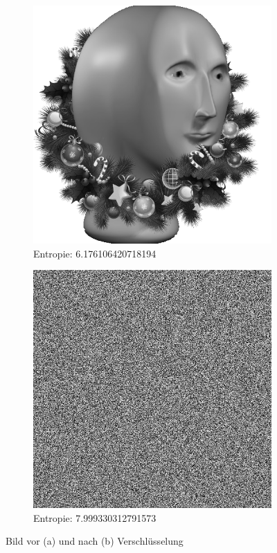 \begin{figure}
	\centering

	\begin{subfigure}{0.35\textwidth}
		\includegraphics[width=\textwidth]{../1/3/gray_6.176106420718194_meme_man.png}
		\caption{Entropie: 6.176106420718194}
	\end{subfigure}
	\hfill
	\begin{subfigure}{0.35\textwidth}
		\includegraphics[width=\textwidth]{../1/3/encrypted_7.999330312791573_meme_man.png}
		\caption{Entropie: 7.999330312791573}
	\end{subfigure}

	\caption{Bild vor (a) und nach (b) Verschlüsselung}
	\label{fig:meme_man}
\end{figure}

